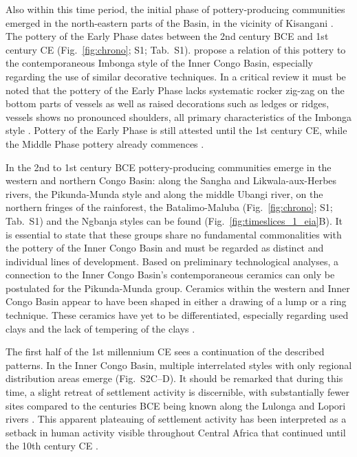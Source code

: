 \documentclass[smallextended,natbib]{svjour3}       %
\begin{document}
Also within this time period, the initial phase of pottery-producing communities emerged in the north-eastern parts of the Basin, in the vicinity of Kisangani \citep[Fig.~S2A;][]{LivingstoneSmith.2017}. The pottery of the Early Phase dates between the 2nd century BCE and 1st century CE (Fig.~\ref{fig:chrono}; S1; Tab.~S1). \citet[110,115]{LivingstoneSmith.2017} propose a relation of this pottery to the contemporaneous Imbonga style of the Inner Congo Basin, especially regarding the use of similar decorative techniques. In a critical review it must be noted that the pottery of the Early Phase \citep[112 Fig.~24]{LivingstoneSmith.2017} lacks systematic rocker zig-zag on the bottom parts of vessels as well as raised decorations such as ledges or ridges, vessels shows no pronounced shoulders, all primary characteristics of the Imbonga style \citep[170 Fig.~84.1--20]{Seidensticker.2021e}. Pottery of the Early Phase is still attested until the 1st century CE, while the Middle Phase pottery already commences \citep[Fig.~\ref{fig:chrono}; S1; Tab.~S1;][]{LivingstoneSmith.2017}.

In the 2nd to 1st century BCE pottery-producing communities emerge in the western and northern Congo Basin: along the Sangha and Likwala-aux-Herbes rivers, the Pikunda-Munda style and along the middle Ubangi river, on the northern fringes of the rainforest, the Batalimo-Maluba (Fig.~\ref{fig:chrono}; S1; Tab.~S1) and the Ngbanja styles can be found (Fig.~\ref{fig:timeslices_1_eia}B). It is essential to state that these groups share no fundamental commonalities with the pottery of the Inner Congo Basin and must be regarded as distinct and individual lines of development. Based on preliminary technological analyses, a connection to the Inner Congo Basin's contemporaneous ceramics can only be postulated for the Pikunda-Munda group. Ceramics within the western and Inner Congo Basin appear to have been shaped in either a drawing of a lump or a ring technique. These ceramics have yet to be differentiated, especially regarding used clays and the lack of tempering of the clays \citep{Seidensticker.2020}. 

The first half of the 1st millennium CE sees a continuation of the described patterns. In the Inner Congo Basin, multiple interrelated styles with only regional distribution areas emerge (Fig.~S2C--D). It should be remarked that during this time, a slight retreat of settlement activity is discernible, with substantially fewer sites compared to the centuries BCE being known along the Lulonga and Lopori rivers \citep[224]{Seidensticker.2021e}. This apparent plateauing of settlement activity has been interpreted as a setback in human activity visible throughout Central Africa that continued until the 10th century CE \citep{Seidensticker.2021}.
\end{document}
